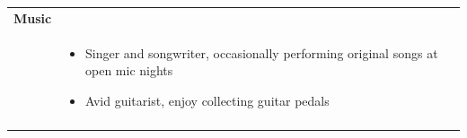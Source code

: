 \documentclass[11pt]{article}
\begin{document}
\begin{minipage}[t][0pt]{\linewidth}
\begin{tabular}[t]{p{2cm} p{14cm}}
	               \textbf{Music}                                                                                                                                                                                                                                                                                                                                     \\ &
	               \begin{itemize}
		               \renewcommand{\labelitemi}{$\diamond$}
		               \item Singer and songwriter, occasionally performing original songs at open mic nights
		               \item Avid guitarist, enjoy collecting guitar pedals
	               \end{itemize}                                                                                                                                                                                                                                             \\ &
	               \\
	\end{tabular}
\end{minipage}
\end{document}
